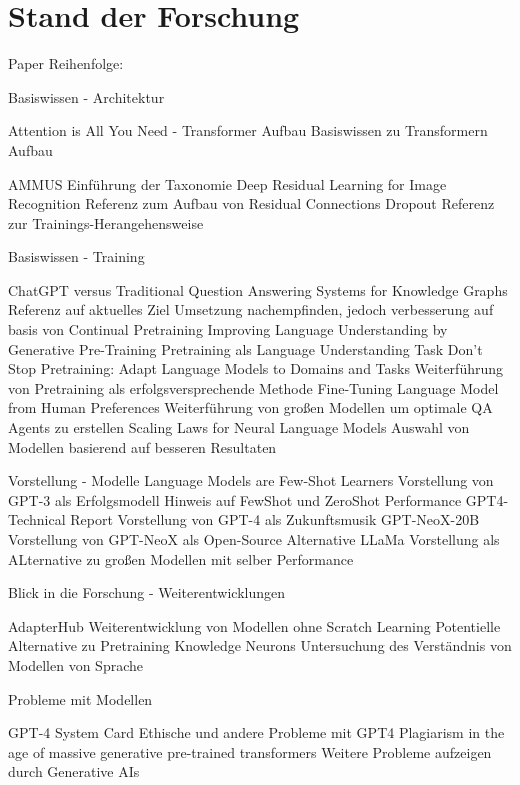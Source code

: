 \chapter{Stand der Forschung}\label{ch:relatedWork}

Paper Reihenfolge:

Basiswissen - Architektur

Attention is All You Need - Transformer Aufbau
    Basiswissen zu Transformern
    Aufbau

AMMUS
    Einführung der Taxonomie
Deep Residual Learning for Image Recognition
    Referenz zum Aufbau von Residual Connections
Dropout
    Referenz zur Trainings-Herangehensweise

Basiswissen - Training

ChatGPT versus Traditional Question Answering Systems for Knowledge Graphs
    Referenz auf aktuelles Ziel
    Umsetzung nachempfinden, jedoch verbesserung auf basis von Continual Pretraining
Improving Language Understanding by Generative Pre-Training
    Pretraining als Language Understanding Task
Don't Stop Pretraining: Adapt Language Models to Domains and Tasks
    Weiterführung von Pretraining als erfolgsversprechende Methode
Fine-Tuning Language Model from Human Preferences
    Weiterführung von großen Modellen
    um optimale QA Agents zu erstellen
Scaling Laws for Neural Language Models
    Auswahl von Modellen basierend auf besseren Resultaten

Vorstellung - Modelle
Language Models are Few-Shot Learners
    Vorstellung von GPT-3 als Erfolgsmodell
    Hinweis auf FewShot und ZeroShot Performance
GPT4-Technical Report
    Vorstellung von GPT-4 als Zukunftsmusik
GPT-NeoX-20B
    Vorstellung von GPT-NeoX als Open-Source Alternative
LLaMa
    Vorstellung als ALternative zu großen Modellen
    mit selber Performance

Blick in die Forschung - Weiterentwicklungen

AdapterHub  
    Weiterentwicklung von Modellen ohne Scratch Learning
    Potentielle Alternative zu Pretraining
Knowledge Neurons
    Untersuchung des Verständnis von Modellen von Sprache

Probleme mit Modellen

GPT-4 System Card
    Ethische und andere Probleme mit GPT4
Plagiarism in the age of massive generative pre-trained transformers
    Weitere Probleme aufzeigen durch Generative AIs

